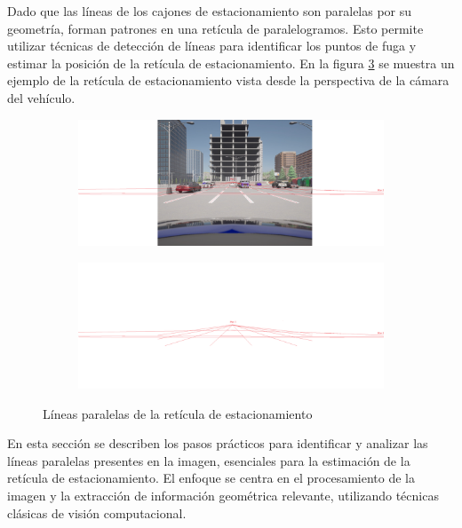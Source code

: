 \noindent
Dado que las líneas de los cajones de estacionamiento son paralelas por su geometría, forman patrones en una retícula de paralelogramos.
Esto permite utilizar técnicas de detección de líneas para identificar los puntos de fuga y estimar la posición de la retícula de estacionamiento.
En la figura \ref{fig:reticule_pov} se muestra un ejemplo de la retícula de estacionamiento vista desde la perspectiva de la cámara del vehículo.

\begin{figure}[!ht]
    \centering
    \begin{subfigure}{0.8\textwidth}
        \includegraphics[width=\textwidth]{img/reticule/pov_reticule}\label {fig:pov_reticule}
    \end{subfigure}
    \begin{subfigure}{0.8\textwidth}
        \includegraphics[width=\textwidth]{img/reticule/pov_reticule_layer}\label {fig:pov_reticule_layers}
    \end{subfigure}
    \caption{Líneas paralelas de la retícula de estacionamiento}
    \label{fig:reticule_pov}
\end{figure}

\noindent
En esta sección se describen los pasos prácticos para identificar y analizar las líneas paralelas presentes en la imagen,
esenciales para la estimación de la retícula de estacionamiento.
El enfoque se centra en el procesamiento de la imagen y la extracción de información geométrica relevante,
utilizando técnicas clásicas de visión computacional.


